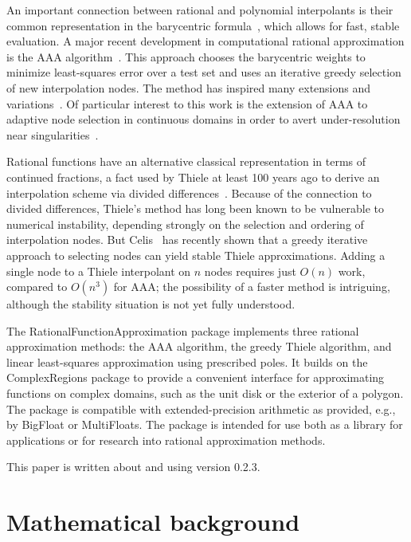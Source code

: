\documentclass{juliacon}
\begin{document}
An important connection between rational and polynomial interpolants is their common representation in the barycentric formula~\cite{berrutBarycentricLagrange2004,schneiderNewAspects1986}, which allows for fast, stable evaluation. A major recent development in computational rational approximation is the AAA algorithm~\cite{nakatsukasaAAAAlgorithm2018}. This approach chooses the barycentric weights to minimize least-squares error over a test set and uses an iterative greedy selection of new interpolation nodes. The method has inspired many extensions and variations~\cite{filipRationalMinimax2018,hochmanFastAAAFast2017,nakatsukasaAlgorithmReal2020,wilberDatadrivenAlgorithms2022}. Of particular interest to this work is the extension of AAA to adaptive node selection in continuous domains in order to avert under-resolution near singularities~\cite{driscollAAARational2024}.

Rational functions have an alternative classical representation in terms of continued fractions, a fact used by Thiele at least 100 years ago to derive an interpolation scheme via divided differences~\cite{milne-thompsonCalculusFinite1933}. Because of the connection to divided differences, Thiele's method has long been known to be vulnerable to numerical instability, depending strongly on the selection and ordering of interpolation nodes. But Celis~\cite{celisAdaptiveThiele2023,celisNumericalContinued2024} has recently shown that a greedy iterative approach to selecting nodes can yield stable Thiele approximations. Adding a single node to a Thiele interpolant on $n$ nodes requires just $O(n)$ work, compared to $O(n^3)$ for AAA; the possibility of a faster method is intriguing, although the stability situation is not yet fully understood.

The \textsf{RationalFunctionApproximation} package implements three rational approximation methods: the AAA algorithm, the greedy Thiele algorithm, and linear least-squares approximation using prescribed poles. It builds on the \textsf{ComplexRegions} package to provide a convenient interface for approximating functions on complex domains, such as the unit disk or the exterior of a polygon. The package is compatible with extended-precision arithmetic as provided, e.g., by \textsf{BigFloat} or \textsf{MultiFloats}. The package is intended for use both as a library for applications or for research into rational approximation methods.

This paper is written about and using version 0.2.3. 

\section{Mathematical background}
\label{sec:math}
\end{document}
